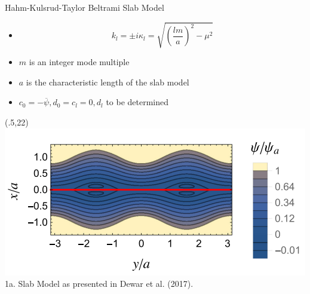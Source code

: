 \documentclass{beamer}
\begin{document}
\begin{frame}[t]
\begin{textblock}{15}
\begin{block}{Hahm-Kulsrud-Taylor Beltrami Slab Model}
\begin{itemize}
    \item \begin{equation}
                k_l = \pm i \kappa_l = \sqrt{\left({\frac{lm}{a}}\right)^2 - \mu^2}
    \end{equation} 
    \item $m$ is an integer mode multiple
    \item $a$ is the characteristic length of the slab model
    \item $c_0=-\overline{\psi},d_0=c_l=0,d_l$ to be determined

\end{itemize}
\end{block}
\end{textblock}

\begin{textblock}{15}(.5,22)
    \includegraphics[scale=1]{dewar-boundary-ripples.png} 
    \newline
    1a. Slab Model as presented in Dewar et al. (2017). \cite{dewar2017}
\end{textblock}


\end{frame}
\end{document}
